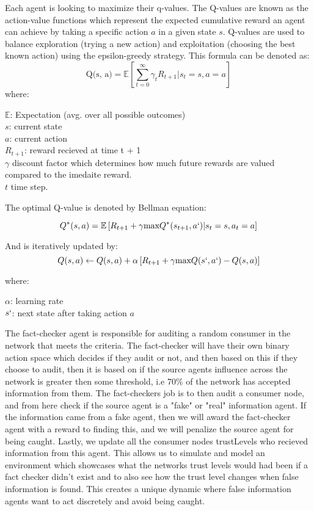 \documentclass[twoside]{article}
\begin{document}
Each agent is looking to maximize their q-values. The Q-values are known as the action-value functions which represent the expected cumulative reward an agent can achieve by taking a specific action $a$ in a  given state $s$. Q-values are used to balance exploration (trying a new action) and exploitation (choosing the best known action) using the epsilon-greedy strategy. This formula can be denoted as:
\[
\text{Q(s, a)} = \mathbb{E}\left[\sum_{t=0}^{\infty}\gamma_{t}R_{t + 1} | s_{t} = s, a = a\right]
\]
where:

$\mathbb{E}$: Expectation (avg. over all possible outcomes)\\
$s$: current state\\
$a$: current action\\
$R_{t+1}$: reward recieved at time t + 1\\
$\gamma$ discount factor which determines how much future rewards are 
valued compared to the imedaite reward.\\
$t$ time step.

The optimal Q-value is denoted by Bellman equation:

\[
Q^{*}(s, a) = \mathbb{E} \left[R_{t+1} + \gamma\text{max}Q^{*}(s_{t+1}, a`) | s_{t} = s, a_{t} = a\right]
\]

And is iteratively updated by:
\[
Q(s, a) \leftarrow Q(s, a) + \alpha \left[R_{t+1} + \gamma\text{max}Q(s`,a`) - Q(s, a)\right]
\]

where:

$\alpha$: learning rate\\
$s`$: next state after taking action $a$


The fact-checker agent is responsible for auditing a random consumer in the network that meets the criteria. The fact-checker will have their own binary action space which decides if they audit or not, and then based on this if they choose to audit, then it is based on if the source agents influence across the network is greater then some threshold, i.e 70\% of the network has accepted information from them. The fact-checkers job is to then audit a consumer node, and from here check if the source agent is a "fake" or "real" information agent. If the information came from a fake agent, then we will award the fact-checker agent with a reward to finding this, and we will penalize the source agent for being caught. Lastly, we update all the consumer nodes trustLevels who recieved information from this agent. This allows us to simulate and model an environment which showcases what the networks trust levels would had been if a fact checker didn't exist and to also see how the trust level changes when false information is found. This creates a unique dynamic where false information agents want to act discretely and avoid being caught.
\end{document}
